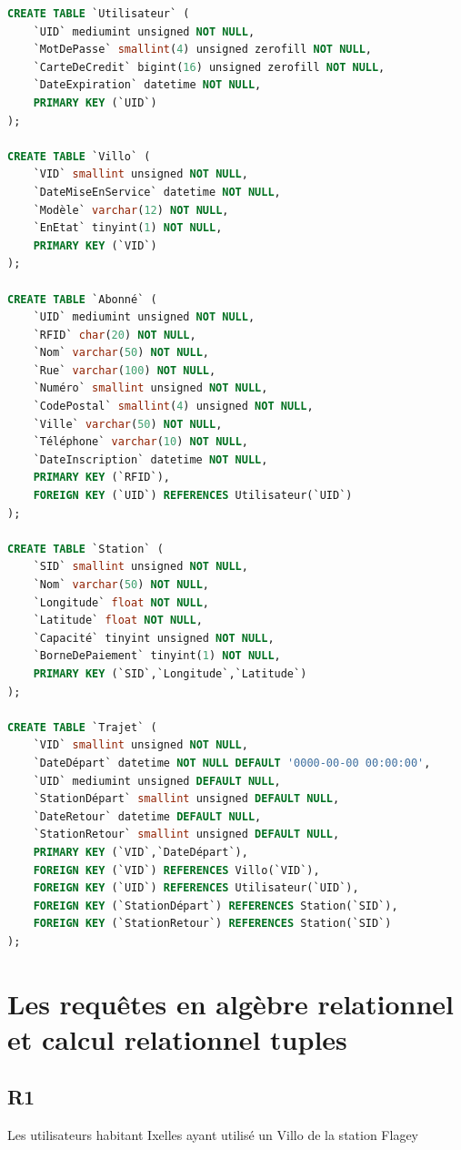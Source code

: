 \documentclass[a4paper, 12pt]{report}
\begin{document}
\begin{lstlisting}[language=sql]
CREATE TABLE `Utilisateur` (
	`UID` mediumint unsigned NOT NULL,
	`MotDePasse` smallint(4) unsigned zerofill NOT NULL,
	`CarteDeCredit` bigint(16) unsigned zerofill NOT NULL,
	`DateExpiration` datetime NOT NULL,
	PRIMARY KEY (`UID`)
);

CREATE TABLE `Villo` (
	`VID` smallint unsigned NOT NULL,
	`DateMiseEnService` datetime NOT NULL,
	`Modèle` varchar(12) NOT NULL,
	`EnEtat` tinyint(1) NOT NULL,
	PRIMARY KEY (`VID`)
);

CREATE TABLE `Abonné` (
	`UID` mediumint unsigned NOT NULL,
	`RFID` char(20) NOT NULL,
	`Nom` varchar(50) NOT NULL,
	`Rue` varchar(100) NOT NULL,
	`Numéro` smallint unsigned NOT NULL,
	`CodePostal` smallint(4) unsigned NOT NULL,
	`Ville` varchar(50) NOT NULL,
	`Téléphone` varchar(10) NOT NULL,
	`DateInscription` datetime NOT NULL,
	PRIMARY KEY (`RFID`),
	FOREIGN KEY (`UID`) REFERENCES Utilisateur(`UID`)
);

CREATE TABLE `Station` (
	`SID` smallint unsigned NOT NULL,
	`Nom` varchar(50) NOT NULL,
	`Longitude` float NOT NULL,
	`Latitude` float NOT NULL,
	`Capacité` tinyint unsigned NOT NULL,
	`BorneDePaiement` tinyint(1) NOT NULL,
	PRIMARY KEY (`SID`,`Longitude`,`Latitude`)
);

CREATE TABLE `Trajet` (
	`VID` smallint unsigned NOT NULL,
	`DateDépart` datetime NOT NULL DEFAULT '0000-00-00 00:00:00',
	`UID` mediumint unsigned DEFAULT NULL,
	`StationDépart` smallint unsigned DEFAULT NULL,
	`DateRetour` datetime DEFAULT NULL,
	`StationRetour` smallint unsigned DEFAULT NULL,
	PRIMARY KEY (`VID`,`DateDépart`),
	FOREIGN KEY (`VID`) REFERENCES Villo(`VID`),
	FOREIGN KEY (`UID`) REFERENCES Utilisateur(`UID`),
	FOREIGN KEY (`StationDépart`) REFERENCES Station(`SID`),
	FOREIGN KEY (`StationRetour`) REFERENCES Station(`SID`)
);
\end{lstlisting}

\section*{Les requêtes en algèbre relationnel et calcul relationnel tuples} %

\subsection*{R1}

Les utilisateurs habitant Ixelles ayant utilisé un Villo de la station Flagey
\end{document}
